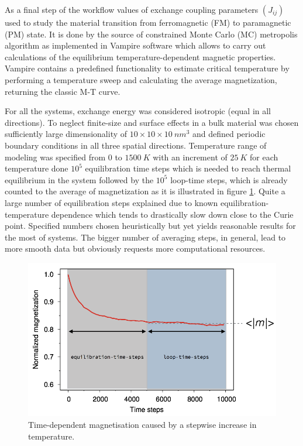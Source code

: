 As a final step of the workflow values of exchange coupling parameters $(J_{ij})$ used to study the material transition from ferromagnetic (FM) to paramagnetic (PM) state. It is done by the source of constrained Monte Carlo (MC) \cite{Evans_2010} metropolis algorithm as implemented in Vampire \cite{Evans_2014, Evans_2015} software which allows to carry out calculations of the equilibrium temperature-dependent magnetic properties. Vampire contains a predefined functionality to estimate critical temperature by performing a temperature sweep and calculating the average magnetization, returning the classic M-T curve.

For all the systems, exchange energy was considered isotropic (equal in all directions). To neglect finite-size and surface effects in a bulk material was chosen sufficiently large dimensionality of $10 \times 10 \times 10\ nm^3$ and defined periodic boundary conditions in all three spatial directions.  Temperature range of modeling was specified from $0$ to $1500\ K$ with an increment of $25\ K$ for each temperature done $10^5$ equilibration time steps which is needed to reach thermal equilibrium in the system followed by the $10^5$ loop-time steps, which is already counted to the average of magnetization as it is illustrated in figure \ref{fig:time_magnetization}.  Quite a large number of equilibration steps explained due to known equilibration-temperature dependence which tends to drastically slow down close to the Curie point. Specified numbers chosen heuristically but yet yields reasonable results for the most of systems.
The bigger number of averaging steps, in general, lead to more smooth data but obviously requests more computational resources.

\begin{figure}[H]
\centering
\captionsetup{justification=centering,margin=2cm}
\includegraphics[width=120mm]{fig/dft_fig/time_magnetization.png}
\caption[Time-dependent magnetisation caused by a stepwise increase in temperature.]{Time-dependent magnetisation caused by a stepwise increase in temperature.}
\label{fig:time_magnetization}
\end{figure}

